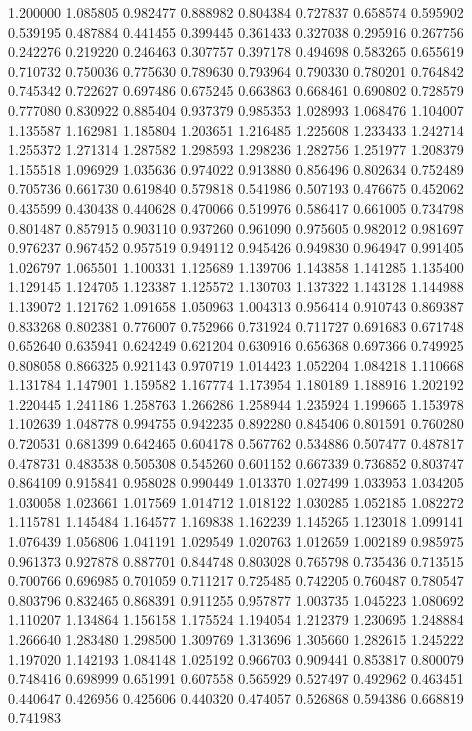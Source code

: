 1.200000
1.085805
0.982477
0.888982
0.804384
0.727837
0.658574
0.595902
0.539195
0.487884
0.441455
0.399445
0.361433
0.327038
0.295916
0.267756
0.242276
0.219220
0.246463
0.307757
0.397178
0.494698
0.583265
0.655619
0.710732
0.750036
0.775630
0.789630
0.793964
0.790330
0.780201
0.764842
0.745342
0.722627
0.697486
0.675245
0.663863
0.668461
0.690802
0.728579
0.777080
0.830922
0.885404
0.937379
0.985353
1.028993
1.068476
1.104007
1.135587
1.162981
1.185804
1.203651
1.216485
1.225608
1.233433
1.242714
1.255372
1.271314
1.287582
1.298593
1.298236
1.282756
1.251977
1.208379
1.155518
1.096929
1.035636
0.974022
0.913880
0.856496
0.802634
0.752489
0.705736
0.661730
0.619840
0.579818
0.541986
0.507193
0.476675
0.452062
0.435599
0.430438
0.440628
0.470066
0.519976
0.586417
0.661005
0.734798
0.801487
0.857915
0.903110
0.937260
0.961090
0.975605
0.982012
0.981697
0.976237
0.967452
0.957519
0.949112
0.945426
0.949830
0.964947
0.991405
1.026797
1.065501
1.100331
1.125689
1.139706
1.143858
1.141285
1.135400
1.129145
1.124705
1.123387
1.125572
1.130703
1.137322
1.143128
1.144988
1.139072
1.121762
1.091658
1.050963
1.004313
0.956414
0.910743
0.869387
0.833268
0.802381
0.776007
0.752966
0.731924
0.711727
0.691683
0.671748
0.652640
0.635941
0.624249
0.621204
0.630916
0.656368
0.697366
0.749925
0.808058
0.866325
0.921143
0.970719
1.014423
1.052204
1.084218
1.110668
1.131784
1.147901
1.159582
1.167774
1.173954
1.180189
1.188916
1.202192
1.220445
1.241186
1.258763
1.266286
1.258944
1.235924
1.199665
1.153978
1.102639
1.048778
0.994755
0.942235
0.892280
0.845406
0.801591
0.760280
0.720531
0.681399
0.642465
0.604178
0.567762
0.534886
0.507477
0.487817
0.478731
0.483538
0.505308
0.545260
0.601152
0.667339
0.736852
0.803747
0.864109
0.915841
0.958028
0.990449
1.013370
1.027499
1.033953
1.034205
1.030058
1.023661
1.017569
1.014712
1.018122
1.030285
1.052185
1.082272
1.115781
1.145484
1.164577
1.169838
1.162239
1.145265
1.123018
1.099141
1.076439
1.056806
1.041191
1.029549
1.020763
1.012659
1.002189
0.985975
0.961373
0.927878
0.887701
0.844748
0.803028
0.765798
0.735436
0.713515
0.700766
0.696985
0.701059
0.711217
0.725485
0.742205
0.760487
0.780547
0.803796
0.832465
0.868391
0.911255
0.957877
1.003735
1.045223
1.080692
1.110207
1.134864
1.156158
1.175524
1.194054
1.212379
1.230695
1.248884
1.266640
1.283480
1.298500
1.309769
1.313696
1.305660
1.282615
1.245222
1.197020
1.142193
1.084148
1.025192
0.966703
0.909441
0.853817
0.800079
0.748416
0.698999
0.651991
0.607558
0.565929
0.527497
0.492962
0.463451
0.440647
0.426956
0.425606
0.440320
0.474057
0.526868
0.594386
0.668819
0.741983
